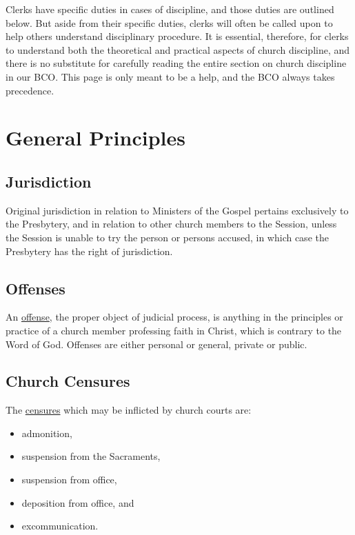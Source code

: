 \documentclass[
]{book}
\providecommand{\tightlist}{%
  \setlength{\itemsep}{0pt}\setlength{\parskip}{0pt}}
\begin{document}
Clerks have specific duties in cases of discipline, and those duties are outlined below. But aside from their specific duties, clerks will often be called upon to help others understand disciplinary procedure. It is essential, therefore, for clerks to understand both the theoretical and practical aspects of church discipline, and there is no substitute for carefully reading the entire section on church discipline in our BCO. This page is only meant to be a help, and the BCO always takes precedence.

\hypertarget{general-principles}{%
\section{General Principles}\label{general-principles}}

\hypertarget{jurisdiction}{%
\subsection{Jurisdiction}\label{jurisdiction}}

Original jurisdiction in relation to Ministers of the Gospel pertains exclusively to the Presbytery, and in relation to other church members to the Session, unless the Session is unable to try the person or persons accused, in which case the Presbytery has the right of jurisdiction.

\hypertarget{offenses}{%
\subsection{Offenses}\label{offenses}}

An \href{https://evangel.pressbooks.com/chapter/32-offenses/}{offense}, the proper object of judicial process, is anything in the principles or practice of a church member professing faith in Christ, which is contrary to the Word of God. Offenses are either personal or general, private or public.

\hypertarget{church-censures}{%
\subsection{Church Censures}\label{church-censures}}

The \href{https://evangel.pressbooks.com/chapter/33-church-censures/}{censures} which may be inflicted by church courts are:

\begin{itemize}
\tightlist
\item
  admonition,
\item
  suspension from the Sacraments,
\item
  suspension from office,
\item
  deposition from office, and
\item
  excommunication.
\end{itemize}
\end{document}
